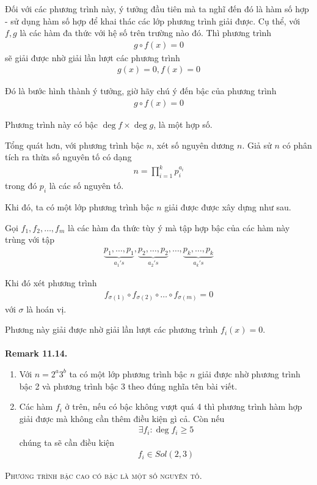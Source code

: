 \documentclass[a4paper,oneside]{book}
\numberwithin{equation}{chapter}
\begin{document}
Đối với các phương trình này, ý tưởng đầu tiên mà ta nghĩ đến đó là hàm số hợp - sử dụng hàm số hợp để khai thác các lớp phương trình giải được. Cụ thể, với $f,g$ là các hàm đa thức với hệ số trên trường nào đó. Thì phương trình 
\begin{align}
g \circ f\left( x \right) = 0
\end{align}
sẽ giải được nhờ giải lần lượt các phương trình 
\begin{align}
g\left( x \right) = 0,f\left( x \right) = 0
\end{align}

Đó là bước hình thành ý tưởng, giờ hãy chú ý đến bậc của phương trình
\begin{align}
g \circ f\left( x \right) = 0
\end{align}

Phương trình này có bậc $\deg f\times \deg g$, là một hợp số.

Tổng quát hơn, với phương trình bậc $n$, xét số nguyên dương $n$. Giả sử $n$ có phân tích ra thừa số nguyên tố có dạng
\begin{align}
n = \prod\limits_{i = 1}^k {p_i^{{a_i}}} 
\end{align}
trong đó ${p_i}$ là các số nguyên tố.

Khi đó, ta có một lớp phương trình bậc $n$ giải được được xây dựng như sau.

Gọi ${f_1},{f_2},\ldots,{f_m}$ là các hàm đa thức tùy ý mà tập hợp bậc của các hàm này trùng với tập 
\begin{align}
\underbrace {{p_1},\ldots,{p_1}}_{{a_1}'s},\underbrace {{p_2},\ldots,{p_2}}_{{a_2}'s},\ldots,\underbrace {{p_k},\ldots,{p_k}}_{{a_k}'s}
\end{align}

Khi đó xét phương trình 
\begin{align}
{f_{\sigma \left( 1 \right)}} \circ {f_{\sigma \left( 2 \right)}} \circ \ldots \circ {f_{\sigma \left( m \right)}} = 0
\end{align}
với $\sigma $ là hoán vị.

Phương này giải được nhờ giải lần lượt các phương trình ${f_i}\left( x \right) = 0$.\\
\\
\textbf{Remark 11.14.} 
\begin{enumerate}
\item Với $n = {2^a}{3^b}$ ta có một lớp phương trình bậc $n$ giải được nhờ phương trình bậc 2 và phương trình bậc 3 theo đúng nghĩa tên bài viết.
\item Các hàm ${f_i}$ ở trên, nếu có bậc không vượt quá 4 thì phương trình hàm hợp giải được mà không cần thêm điều kiện gì cả. Còn nếu 
\begin{align}
\exists {f_i}:\deg {f_i} \ge 5
\end{align}
chúng ta sẽ cần điều kiện 
\begin{align}
{f_i} \in Sol\left( {2,3} \right)
\end{align}
\end{enumerate}
\vspace{0.5cm}
\textsc{Phương trình bậc cao có bậc là một số nguyên tố.} 
\end{document}
